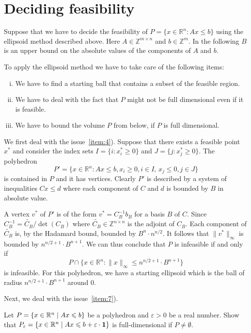 \section{Deciding feasibility}
\label{sec:deciding-feasibility}
Suppose that we have to decide the feasibility of $P = \{x ∈  ℝ^n : Ax ≤ b\}$
using the ellipsoid method described above. Here $A ∈ ℤ^{m ×n}$
and $b ∈ ℤ^{m}$.
In the following $B$
is an upper bound on the absolute values of the components of $A$
and $b$.

To apply the ellipsoid method we have to take care of the following items: 
\begin{enumerate}[i)]
\item We have to find a starting ball that contains a subset of the feasible region. \label{item:4}
\item We have to deal with the fact that $P$ might not be full dimensional even if it is feasible.  \label{item:7}
\item We have to bound the volume $P$ from below, if $P$ is full dimensional. \label{item:8}
\end{enumerate}


We first deal with the issue~\ref{item:4}). 
Suppose that there exists a feasible point $x^*$ and consider the index sets 
$I = \{ i : x^*_i ≥0 \}$ and $J = \{j : x^*_j ≥0\}$.    The polyhedron 
\begin{displaymath}
P' =   \{ x ∈ ℝ^n : Ax ≤b, x_i ≥ 0, i ∈ I, \, x_j ≤ 0, j ∈ J\}
\end{displaymath}
is contained in $P$ and it has vertices. Clearly $P'$ is described by a system of inequalities $Cx≤d$ where each component of $C$ and $d$ is bounded by $B$ in absolute value. 

A vertex $v^*$ of $P'$ is of the form $v^* = C_B^{-1} b_B$ for a basis $B$ of $C$. Since $C_B^{-1} = \widetilde{C_B} / \det(C_B)$ where $\widetilde{C_B} \in ℤ^{n ×n}$ is the adjoint of $C_B$. Each component of $\widetilde{C_B}$ is, by the Hadamard bound, bounded by $B^n ⋅ n^{n/2}$.  It follows that $\|v^*\|_∞$ is bounded by 
 $n^{n/2+1} ⋅ B^{n+1}$. We can thus conclude that $P$ is infeasible if and only if 
 \begin{displaymath}
   P ∩ \{ x ∈ ℝ^n : \|x\|_∞ ≤ n^{n/2+1} ⋅ B^{n+1} \}
 \end{displaymath}
is infeasible. 
For this polyhedron, we have a starting ellipsoid which is the ball of radius $n^{n/2+1} ⋅ B^{n+1} $ around $0$.  


Next, we deal with the issue~\ref{item:7}). 
\begin{exercise}
  \label{el:ex:11}
  Let $P = \{ x \in \mathbb{R}^n \mid Ax\leqslant b\}$ be a polyhedron and $\varepsilon>0$ be a
  real number. Show that $P_\varepsilon = \{ x \in \mathbb{R}^n \mid Ax\leqslant b+ \varepsilon\cdot
  \mathbf{1}\}$ is full-dimensional if $P \neq \emptyset$.
\end{exercise}


